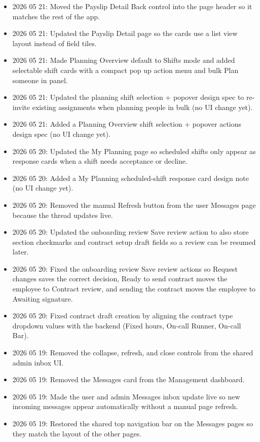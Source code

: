 \documentclass[11pt]{article}
\begin{document}
\begin{itemize}
    \item 2026 05 21: Moved the Payslip Detail Back control into the page header so it matches the rest of the app.
    \item 2026 05 21: Updated the Payslip Detail page so the cards use a list view layout instead of field tiles.
    \item 2026 05 21: Made Planning Overview default to Shifts mode and added selectable shift cards with a compact pop up action menu and bulk Plan someone in panel.
    \item 2026 05 21: Updated the planning shift selection + popover design spec to re-invite existing assignments when planning people in bulk (no UI change yet).
    \item 2026 05 21: Added a Planning Overview shift selection + popover actions design spec (no UI change yet).
    \item 2026 05 20: Updated the My Planning page so scheduled shifts only appear as response cards when a shift needs acceptance or decline.
    \item 2026 05 20: Added a My Planning scheduled-shift response card design note (no UI change yet).
    \item 2026 05 20: Removed the manual Refresh button from the user Messages page because the thread updates live.
    \item 2026 05 20: Updated the onboarding review Save review action to also store section checkmarks and contract setup draft fields so a review can be resumed later.
    \item 2026 05 20: Fixed the onboarding review Save review actions so Request changes saves the correct decision, Ready to send contract moves the employee to Contract review, and sending the contract moves the employee to Awaiting signature.
    \item 2026 05 20: Fixed contract draft creation by aligning the contract type dropdown values with the backend (Fixed hours, On-call Runner, On-call Bar).
    \item 2026 05 19: Removed the collapse, refresh, and close controls from the shared admin inbox UI.
    \item 2026 05 19: Removed the Messages card from the Management dashboard.
    \item 2026 05 19: Made the user and admin Messages inbox update live so new incoming messages appear automatically without a manual page refresh.
    \item 2026 05 19: Restored the shared top navigation bar on the Messages pages so they match the layout of the other pages.

\end{itemize}
\end{document}
